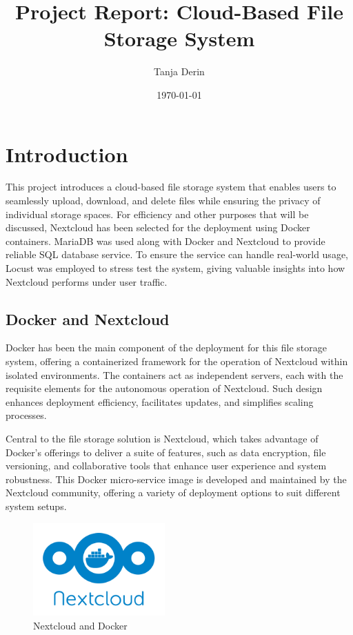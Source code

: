 \documentclass[12pt]{article}
\title{Project Report: Cloud-Based File Storage System}
\author{Tanja Derin}
\date{\today}
\begin{document}
\maketitle

\tableofcontents


\section{Introduction}
\label{sec:introduction}
This project introduces a cloud-based file storage system that enables users to seamlessly upload, download, and delete files while ensuring the privacy of individual storage spaces. For efficiency and other purposes that will be discussed, Nextcloud has been selected for the deployment using Docker containers. MariaDB was used along with Docker and Nextcloud to provide reliable SQL database service. To ensure the service can handle real-world usage, Locust was employed to stress test the system, giving valuable insights into how Nextcloud performs under user traffic.

\subsection{Docker and Nextcloud}
\label{sec:Docker and Nextcloud}
Docker has been the main component of the deployment for this file storage system, offering a containerized framework for the operation of Nextcloud within isolated environments. The containers act as independent servers, each with the requisite elements for the autonomous operation of Nextcloud. Such design enhances deployment efficiency, facilitates updates, and simplifies scaling processes.

Central to the file storage solution is Nextcloud, which takes advantage of Docker’s offerings to deliver a suite of features, such as data encryption, file versioning, and collaborative tools that enhance user experience and system robustness. This Docker micro-service image is developed and maintained by the Nextcloud community, offering a variety of deployment options to suit different system setups. 

\begin{figure}
  \centering
  \includegraphics[width=0.45\textwidth]{Nextcloud_withDocker.png}
  \caption{Nextcloud and Docker}
  \label{fig:yourlabel}
\end{figure}
\end{document}
